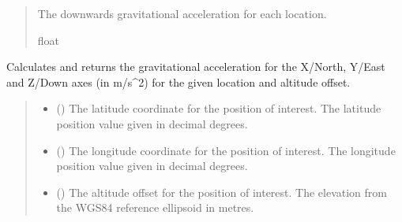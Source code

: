 \documentclass[letterpaper,10pt,english]{sphinxmanual}
\begin{document}
\begin{fulllineitems}
\begin{fulllineitems}
\begin{quote}
\begin{description}
\begin{itemize}
\end{itemize}

\sphinxAtStartPar
The downwards gravitational acceleration for each location.

\sphinxAtStartPar
float

\end{description}\end{quote}

\end{fulllineitems}


\begin{fulllineitems}
\label{\detokenize{modules/gravity/nima:qnav.gravity.nima.WGS84Gravity.calc_gravity_xyz}}
\pysigstartsignatures
{}
\pysigstopsignatures
\sphinxAtStartPar
Calculates and returns the gravitational acceleration for the
X/North, Y/East and Z/Down axes (in m/s\textasciicircum{}2) for the given location
and altitude offset.
\begin{quote}\begin{description}
\begin{itemize}
\item {} 
\sphinxAtStartPar
{} () \textendash{} The latitude coordinate for the position of interest.
The latitude position value given in decimal degrees.

\item {} 
\sphinxAtStartPar
{} () \textendash{} The longitude coordinate for the position of interest.
The longitude position value given in decimal degrees.

\item {} 
\sphinxAtStartPar
{} () \textendash{} The altitude offset for the position of interest.
The elevation from the WGS\sphinxhyphen{}84 reference ellipsoid in metres.


\end{itemize}
\end{description}
\end{quote}
\end{fulllineitems}
\end{fulllineitems}
\end{document}
